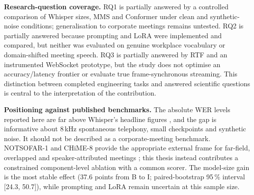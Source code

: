 \documentclass[12pt]{report}
\begin{document}
\textbf{Research-question coverage.} RQ1 is partially answered by a controlled comparison of Whisper sizes, MMS and Conformer under clean and synthetic-noise conditions; generalisation to corporate meetings remains untested. RQ2 is partially answered because prompting and LoRA were implemented and compared, but neither was evaluated on genuine workplace vocabulary or domain-shifted meeting speech. RQ3 is partially answered by RTF and an instrumented WebSocket prototype, but the study does not optimise an accuracy/latency frontier or evaluate true frame-synchronous streaming. This distinction between completed engineering tasks and answered scientific questions is central to the interpretation of the contribution.

\textbf{Positioning against published benchmarks.} The absolute WER levels reported here are far above Whisper's headline figures \cite{radford2023robust}, and the gap is informative about 8\,kHz spontaneous telephony, small checkpoints and synthetic noise. It should not be described as a corporate-meeting benchmark. NOTSOFAR-1 and CHiME-8 provide the appropriate external frame for far-field, overlapped and speaker-attributed meetings \cite{vinnikov2024notsofar,cornell2024chime8}; this thesis instead contributes a constrained component-level ablation with a common scorer. The model-size gain is the most stable effect (37.6 points from B to I; paired-bootstrap 95\,\% interval [24.3, 50.7]), while prompting and LoRA remain uncertain at this sample size.
\end{document}
